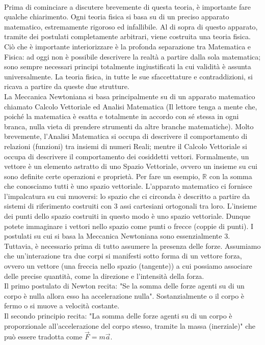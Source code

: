 \documentclass[]{scrbook}
\begin{document}
	\\
	Prima di cominciare a discutere brevemente di questa teoria, è importante fare qualche chiarimento. Ogni teoria fisica si basa su di un preciso apparato matematico, estremamente rigoroso ed infallibile. Al di sopra di questo apparato, tramite dei postulati completamente arbitrari, viene costruita una teoria fisica. Ciò che è importante interiorizzare è la profonda separazione tra Matematica e Fisica: ad oggi non è possibile descrivere la realtà a partire dalla sola matematica; sono sempre necessari principi totalmente ingiustificati la cui validità è assunta universalmente. La teoria fisica, in tutte le sue sfaccettature e contraddizioni, si ricava a partire da queste due strutture.\\
	La Meccanica Newtoniana si basa principalmente su di un apparato matematico chiamato Calcolo Vettoriale ed Analisi Matematica (Il lettore tenga a mente che, poiché la matematica è esatta e totalmente in accordo con sé stessa in ogni branca, nulla vieta di prendere strumenti da altre branche matematiche). Molto brevemente, l'Analisi Matematica si occupa di descrivere il comportamento di relazioni (funzioni) tra insiemi di numeri Reali; mentre il Calcolo Vettoriale si occupa di descrivere il comportamento dei cosiddetti vettori. Formalmente, un vettore è un elemento astratto di uno Spazio Vettoriale, ovvero un insieme su cui sono definite certe operazioni e proprietà. Per fare un esempio, $\mathbb{R}$ con la somma che conosciamo tutti è uno spazio vettoriale. L'apparato matematico ci fornisce l'impalcatura su cui muoversi: lo spazio che ci circonda è descritto a partire da sistemi di riferimento costruiti con 3 assi cartesiani ortogonali tra loro. L'insieme dei punti dello spazio costruiti in questo modo è uno spazio vettoriale. Dunque potete immaginare i vettori nello spazio come punti o frecce (coppie di punti). I postulati su cui si basa la Meccanica Newtoniana sono essenzialmente 3. Tuttavia, è necessario prima di tutto assumere la presenza delle forze. Assumiamo che un'interazione tra due corpi si manifesti sotto forma di un vettore forza, ovvero un vettore (una freccia nello spazio (tangente)) a cui possiamo associare delle precise quantità, come la direzione e l'intensità della forza.\\
	Il primo postulato di Newton recita: "Se la somma delle forze agenti su di un corpo è nulla allora esso ha accelerazione nulla". Sostanzialmente o il corpo è fermo o si muove a velocità costante. \\
	Il secondo principio recita: "La somma delle forze agenti su di un corpo è proporzionale all'accelerazione del corpo stesso, tramite la massa (inerziale)" che può essere tradotta come $\vec{F}=m\vec{a}$.\\
\end{document}
